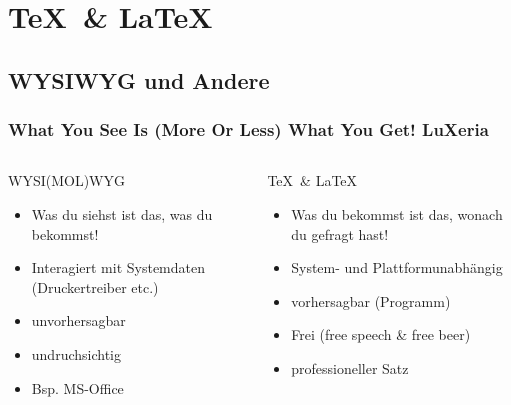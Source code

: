 \section{\TeX~\& \LaTeX}
\begin{frame}
	\frametitle{}
	\tableofcontents[currentsection]
\end{frame}

\subsection{WYSIWYG und Andere}
\begin{frame}
	\frametitle{What You See Is (More Or Less) What You Get! \hfill{} \footnotesize{LuXeria}}
	\begin{columns}
		\begin{column}{5cm}
			\begin{alertblock}{WYSI(MOL)WYG}
				\begin{itemize}
					\item Was du siehst ist das, was du bekommst!
					\item Interagiert mit Systemdaten (Druckertreiber etc.)
					\item unvorhersagbar
					\item undruchsichtig
					\item Bsp. MS-Office
				\end{itemize}
			\end{alertblock}
		\end{column}
		\begin{column}{5cm}
			\begin{exampleblock}{\TeX~\& \LaTeX}
				\begin{itemize}
					\item Was du bekommst ist das, wonach du gefragt hast!
					\item System- und Plattformunabhängig
					\item vorhersagbar (Programm)
					\item Frei (free speech \& free beer)
					\item professioneller Satz
				\end{itemize}
			\end{exampleblock}
		\end{column}
	\end{columns}
\end{frame}

